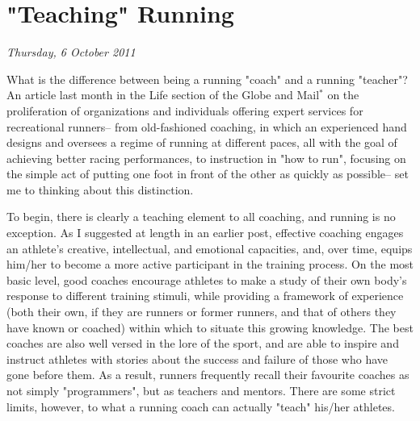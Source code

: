\chapter{"Teaching" Running}
\textit{Thursday, 6 October 2011}
\bigskip

What is the difference between being a running "coach" and a running "teacher"? An article last month in the Life section of the Globe and Mail$^*$ on the proliferation of organizations and individuals offering expert services for recreational runners-- from old-fashioned coaching, in which an experienced hand designs and oversees a regime of running at different paces, all with the goal of achieving better racing performances, to instruction in "how to run", focusing on the simple act of putting one foot in front of the other as quickly as possible-- set me to thinking about this distinction.

To begin, there is clearly a teaching element to all coaching, and running is no exception. As I suggested at length in an earlier post, effective coaching engages an athlete's creative, intellectual, and emotional capacities, and, over time, equips him/her to become a more active participant in the training process. On the most basic level, good coaches encourage athletes to make a study of their own body's response to different training stimuli, while providing a framework of experience (both their own, if they are runners or former runners, and that of others they have known or coached) within which to situate this growing knowledge. The best coaches are also well versed in the lore of the sport, and are able to inspire and instruct athletes with stories about the success and failure of those who have gone before them. As a result, runners frequently recall their favourite coaches as not simply "programmers", but as teachers and mentors. There are some strict limits, however, to what a running coach can actually "teach" his/her athletes.

